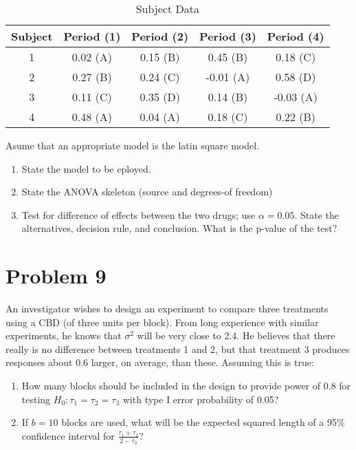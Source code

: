 \documentclass{article}
\begin{document}
\begin{table}[h!]
	\centering
	\caption{Subject Data}
	\begin{tabular}{c c c c c}
		\hline
		\textbf{Subject} & \textbf{Period (1)} & \textbf{Period (2)} & \textbf{Period (3)} & \textbf{Period (4)} \\
		\hline
		1                & 0.02 (A)            & 0.15 (B)            & 0.45 (B)            & 0.18 (C)            \\
		2                & 0.27 (B)            & 0.24 (C)            & -0.01 (A)           & 0.58 (D)            \\
		3                & 0.11 (C)            & 0.35 (D)            & 0.14 (B)            & -0.03 (A)           \\
		4                & 0.48 (A)            & 0.04 (A)            & 0.18 (C)            & 0.22 (B)            \\
		\hline
	\end{tabular}
\end{table}
Asume that an appropriate model is the latin square model.
\begin{enumerate}
	\item State the model to be eployed.
	\item State the ANOVA skeleton (source and degrees-of freedom)
	\item Test for difference of effects between the two drugs; use $\alpha =0.05$. State the alternatives,
	      decision rule, and conclusion. What is the p-value of the test?
\end{enumerate}

\section{Problem 9}
An investigator wishes to design an experiment to compare three treatments using a CBD (of three
units per block). From long experience with similar experiments, he knows that $\sigma^2$ will be very
close to 2.4. He believes that there really is no difference between treatments 1 and 2, but that
treatment 3 produces responses about 0.6 larger, on average, than these. Assuming this is true:

\begin{enumerate}
	\item How many blocks should be included in the design to provide power of 0.8 for testing
	      $H_0: \tau_1 = \tau_2 = \tau_3$ with type I error probability of 0.05?
	\item If $b=10$ blocks are used, what will be the expected squared length of a 95\% confidence interval
	      for $\frac{\tau_1 + \tau_2}{2-\tau_3}$?
\end{enumerate}
\end{document}
